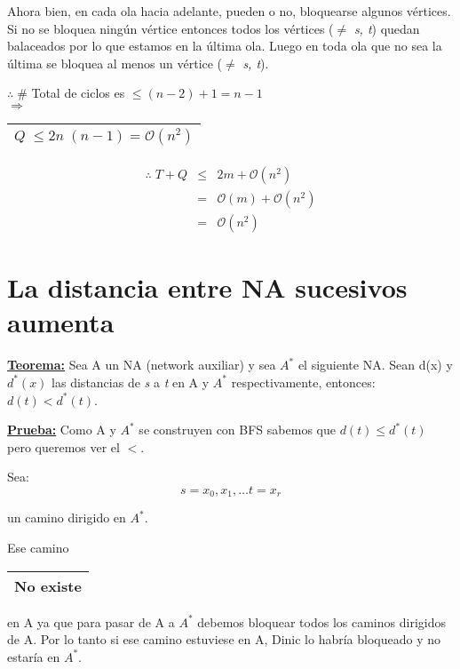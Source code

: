 \documentclass[12pt,a4paper]{report}
\newcounter{neq}
\begin{document}
				\par Ahora bien, en cada ola hacia adelante, pueden o no, bloquearse algunos vértices. Si no se bloquea ningún vértice entonces todos los vértices ($\neq$ \textit{s, t}) quedan balaceados por lo que estamos en la última ola. Luego en toda ola que no sea la última se bloquea al menos un vértice ($\neq$ \textit{s, t}).
				\begin{center}
					$\therefore \; \#$ Total de ciclos es $\leq (n - 2) + 1 = n - 1$ \\
					\vspace{3mm}
					$\Rightarrow$ \begin{tabular}{|c|} \hline $Q \; \leq 2 n \; (n - 1) = \mathcal{O}(n^{2})$ \\ \hline \end{tabular}
				\end{center}

				\begin{eqnarray}
					\nonumber \therefore \; T + Q &\leq & 2 m + \mathcal{O}(n^{2}) \\
					\nonumber &=& \mathcal{O}(m) + \mathcal{O}(n^{2}) \\
					\nonumber &=& \mathcal{O}(n^{2})
				\end{eqnarray}


	\section{La distancia entre NA sucesivos aumenta}
		\textbf{\underline{Teorema:}} Sea A un NA (network auxiliar) y sea $A^{*}$ el siguiente NA. Sean d(x) y $d^{*}(x)$ las distancias de \textit{s} a \textit{t} en A y $A^{*}$ respectivamente, entonces: $d(t) < d^{*}(t)$.

		\textbf{\underline{Prueba:}} Como A y $A^{*}$ se construyen con BFS sabemos que $d(t) \leq d^{*}(t)$ pero queremos ver el $<$.
			\par Sea:
			\[ s = x_{0}, x_{1}, \dotsc t = x_{r} \]
			\par un camino dirigido en $A^{*}$.
			\par Ese camino \begin{tabular}{|c|} \hline No existe \\\hline \end{tabular} en A ya que para pasar de A a $A^{*}$ debemos bloquear todos los caminos dirigidos de A. Por lo tanto si ese camino estuviese en A, Dinic lo habría bloqueado y no estaría en $A^{*}$.
\end{document}
